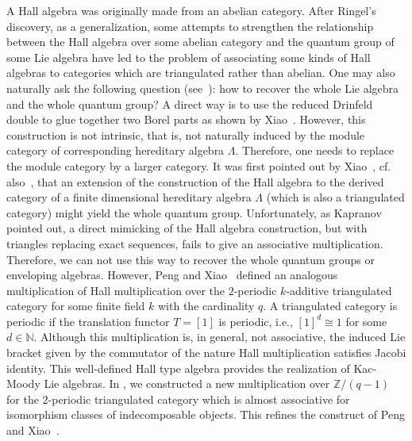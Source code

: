 \documentclass{amsart}
\theoremstyle{definition}
\numberwithin{equation}{section}
\begin{document}
A Hall algebra was originally made from an abelian category. After
Ringel's discovery, as a generalization, some attempts to strengthen
the relationship between the Hall algebra over some abelian category
and the quantum group of some Lie algebra have led to the problem of
associating some kinds of Hall algebras to categories which are
triangulated rather than abelian. One may also naturally ask the
following question (see~\cite{Ringel1990}): how to recover the whole
Lie algebra and the whole quantum group? A direct way is to use the
reduced Drinfeld double to glue together two Borel parts as shown by
Xiao~\cite{Xiao97}. However, this construction is not intrinsic,
that is, not naturally induced by the module category of
corresponding hereditary algebra $\Lambda$. Therefore, one needs to
replace the module category by a larger category. It was first
pointed out by Xiao~\cite{Xiao95}, cf. also~\cite{Kap2}, that an
extension of the construction of the Hall algebra to the derived
category of a finite dimensional hereditary algebra $\Lambda$ (which
is also a triangulated category) might yield the whole quantum
group. Unfortunately, as Kapranov pointed out, a direct mimicking of
the Hall algebra construction, but with triangles replacing exact
sequences, fails to give an associative multiplication. Therefore,
we can not use this way to recover the whole quantum groups or
enveloping algebras. However, Peng and Xiao~\cite{PX2000} defined an
analogous multiplication of Hall multiplication over the
$2$-periodic $k$-additive triangulated category for some finite
field $k$ with the cardinality $q$. A triangulated category is
periodic if the translation functor $T=[1]$ is periodic, i.e.,
$[1]^d\cong 1$ for some $d\in {{\mathbb N}}$. Although this multiplication
is, in general, not associative, the induced Lie bracket given by
the commutator of the nature Hall multiplication satisfies Jacobi
identity. This well-defined Hall type algebra provides the
realization of Kac-Moody Lie algebras. In \cite{Xu2007}, we
constructed a new multiplication over ${{\mathbb Z}}/(q-1)$ for the
$2$-periodic triangulated category which is almost associative for
isomorphism classes of indecomposable objects. This refines the
construct of Peng and Xiao~\cite{PX2000}.
\end{document}
